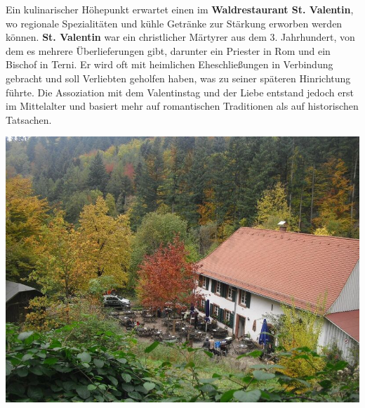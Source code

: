 \documentclass[landscape, a4paper]{article}
\newcommand\alert[1]{\textcolor{PrimaryColor}{\textbf{#1}}}
\begin{document}
\begin{minipage}[t]{0.33\textwidth}
\end{minipage}
\begin{minipage}[t]{0.33\textwidth}
	\vspace{0cm}
	\setlength{\parskip}{0.25cm}

	Ein kulinarischer Höhepunkt erwartet einen im \alert{Waldrestaurant St. Valentin}, wo regionale Spezialitäten und kühle Getränke zur Stärkung erworben werden können. \alert{St. Valentin} war ein christlicher Märtyrer aus dem 3. Jahrhundert, von dem es mehrere Überlieferungen gibt, darunter ein Priester in Rom und ein Bischof in Terni. Er wird oft mit heimlichen Eheschließungen in Verbindung gebracht und soll Verliebten geholfen haben, was zu seiner späteren Hinrichtung führte. Die Assoziation mit dem Valentinstag und der Liebe entstand jedoch erst im Mittelalter und basiert mehr auf romantischen Traditionen als auf historischen Tatsachen.

	\includegraphics[width=\linewidth]{./figures/stvalentin.png}
	\setlength{\parskip}{0.25cm}
	\vspace{0.15cm}


\end{minipage}
\end{document}
